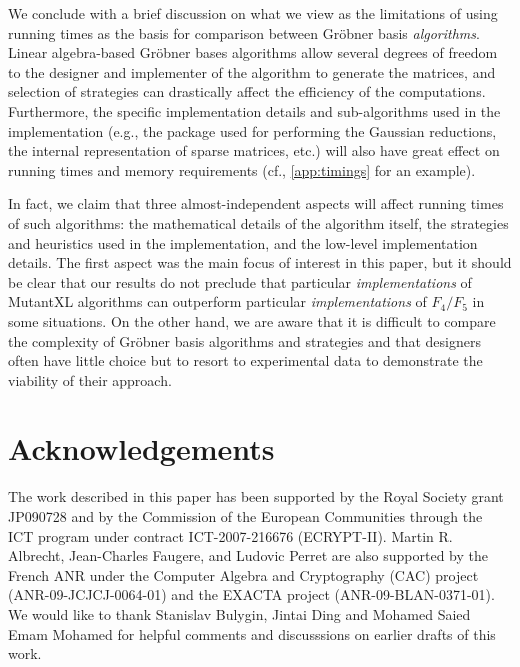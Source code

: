 \documentclass[preprint,draft]{elsarticle}
\begin{document}
We conclude with a brief discussion on what we view as the limitations of using running times as the basis for comparison between Gr\"obner basis {\it algorithms}. Linear algebra-based Gr\"obner bases algorithms allow several degrees of freedom to the designer and implementer of the algorithm to generate the matrices, and selection of strategies can drastically affect the efficiency of the computations. Furthermore, the specific implementation details and sub-algorithms used in the implementation (e.g., the package used for performing the Gaussian reductions, the internal representation of sparse matrices, etc.) will also have great effect on running times and memory requirements (cf., \ref{app:timings} for an example).

In fact, we claim that three almost-independent aspects will affect running times of such algorithms: the mathematical details of the algorithm itself, the strategies and heuristics used in the implementation, and the
low-level implementation details. The first aspect was the main focus of interest in this paper, but it should be clear that 
our results do not preclude that particular {\it implementations} of MutantXL algorithms can outperform particular {\it implementations} of $F_4/F_5$ in some situations. On the other hand, we are aware that it is difficult to compare the complexity of Gr\"obner basis algorithms and strategies and that designers often have little choice but to resort to experimental data to demonstrate the viability of their approach.

\section{Acknowledgements}
The work described in this paper has been supported by the Royal Society grant JP090728 and by the Commission of the European
Communities through the ICT program under contract ICT-2007-216676 (ECRYPT-II). Martin R. Albrecht,
Jean-Charles Faugere, and Ludovic Perret are also supported by the French ANR under the Computer Algebra
and Cryptography (CAC) project (ANR-09-JCJCJ-0064-01) and the EXACTA project (ANR-09-BLAN-0371-01).
We would like to thank Stanislav Bulygin, Jintai Ding and Mohamed Saied Emam Mohamed for helpful comments and discusssions on earlier drafts of this work.

\clearpage




\clearpage
\appendix
\end{document}
